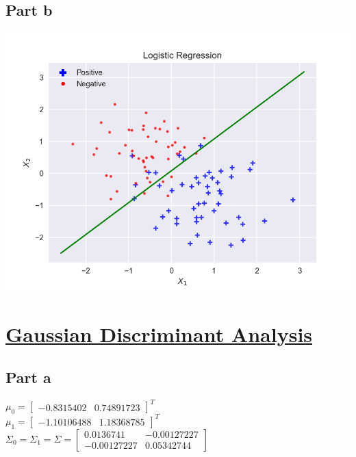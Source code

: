 \documentclass[12pt]{article}
\begin{document}
\subsection*{Part b}
\begin{center}
\includegraphics[scale=0.4]{logistic1.png}
\end{center}

\newpage
\section*{\underline{Gaussian Discriminant Analysis}}
\subsection*{Part a}
\begin{addmargin}[0.3in]{0in}
$\mu_0 = \begin{bmatrix} -0.8315402 & 0.74891723\end{bmatrix}^{T}$ \\
$\mu_1 = \begin{bmatrix} -1.10106488 & 1.18368785\end{bmatrix}^{T}$ \\
$\Sigma_0 = \Sigma_1 = \Sigma = 
\begin{bmatrix}
    0.0136741 & -0.00127227 \\
    -0.00127227 & 0.05342744
\end{bmatrix}$
\end{addmargin}
\end{document}
